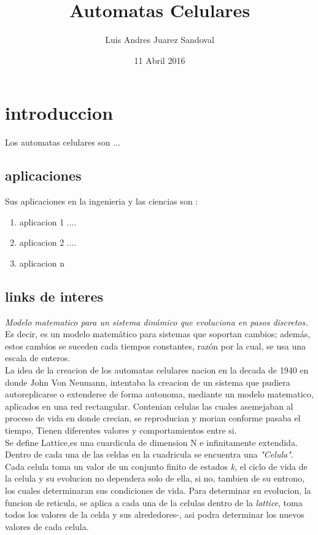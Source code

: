 \documentclass[a4paper,12pt]{article}
\begin{document}
\title{Automatas Celulares}
\author{Luis Andres Juarez Sandoval}
\date{11 Abril 2016} 
\maketitle


\tableofcontents
\newpage
{}


\section{introduccion}
 Los automatas celulares son ...

 \subsection{aplicaciones}
   Sus aplicaciones en la ingenieria y las ciencias son :
  \begin{enumerate}

   \item{aplicacion 1 ....}
   \item{aplicacion 2 ....}
   \item{aplicacion n }


  \end{enumerate}

 \subsection{links de interes}
	\emph{Modelo matematico para un sistema dinámico que evoluciona en pasos discretos.} Es decir, es un modelo matemático para sistemas que soportan cambios; además, estos cambios se suceden cada tiempos constantes, razón por la cual, se usa una escala de enteros. \\
        
La idea de la creacion de los automatas celulares nacion en la decada de 1940 en donde John Von Neumann, intentaba la creacion de un sistema que pudiera autoreplicarse o extenderse de forma autonoma, mediante un modelo matematico, aplicados en una red rectangular. Contenian celulas las cuales asemejaban al proceso de vida en donde crecian, se reproducian y morian conforme pasaba el tiempo, Tienen diferentes valores y comportamientos entre si.\\

Se define Lattice,es una cuardicula de dimension N e infinitamente extendida. Dentro de cada una de las celdas en la cuadricula se encuentra una \emph{"Celula"}. Cada celula toma un valor de un conjunto finito de estados \emph{k}, el ciclo de vida de la celula y su evolucion no dependera solo de ella, si no, tambien de su entrono, los cuales determinaran sus condiciones de vida. Para determinar su evolucion, la funcion de reticula, se aplica a cada una de la celulas dentro de la \emph{lattice}, toma todos los valores de la celda y sus alrededores-, asi podra determinar los nuevos valores de cada celula.
\end{document}

